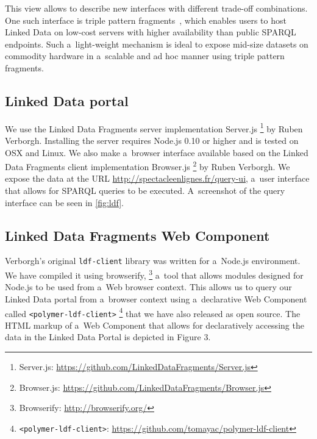 \documentclass[runningheads,a4paper]{llncs}
\begin{document}
This view allows to describe new interfaces with different trade-off combinations.
One such interface is triple pattern fragments~\cite{verborgh2014triplepatterns},
which enables users to host Linked Data on low-cost servers with higher availability
than public SPARQL endpoints.
Such a~light-weight mechanism is ideal to expose mid-size datasets on commodity hardware
in a~scalable and ad hoc manner using triple pattern fragments.

\subsection{Linked Data portal}

We use the Linked Data Fragments server implementation Server.js%
\footnote{Server.js: \url{https://github.com/LinkedDataFragments/Server.js}} by Ruben Verborgh.
Installing the server requires Node.js 0.10 or higher and is tested on OSX and Linux.
We also make a~browser interface available based on the Linked Data Fragments
client implementation Browser.js%
\footnote{Browser.js: \url{https://github.com/LinkedDataFragments/Browser.js}} by Ruben Verborgh.
We expose the data at the URL \url{http://spectacleenlignes.fr/query-ui},
a~user interface that allows for SPARQL queries to be executed.
A~screenshot of the query interface can be seen in \autoref{fig:ldf}.

\subsection{Linked Data Fragments Web Component}

Verborgh's original \texttt{ldf-client} library was written for a~Node.js environment.
We have compiled it using browserify,%
\footnote{Browserify: \url{http://browserify.org/}}
a~tool that allows modules designed for Node.js to be used from a~Web browser context.
This allows us to query our Linked Data portal from a~browser context using a~declarative Web Component
called \texttt{<polymer-ldf-client>}%
\footnote{\texttt{<polymer-ldf-client>}:
\url{https://github.com/tomayac/polymer-ldf-client}}
that we have also released as open source.
The HTML markup of a~Web Component that allows for declaratively accessing the data in the Linked Data Portal is depicted in Figure 3.
\end{document}
